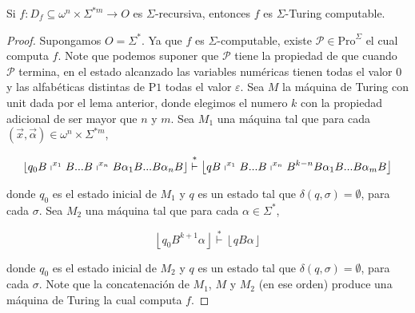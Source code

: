 	\begin{theorem}
		Si $f:D_{f}\subseteq \omega ^{n}\times \Sigma ^{\ast m}\rightarrow O$ es $ \Sigma $-recursiva, entonces $f$ es
    $\Sigma $-Turing computable.

  \begin{proof} Supongamos $O=\Sigma ^{\ast }.$ Ya que $f$ es $\Sigma $-computable, existe
    $ \mathcal{P}\in \mathrm{Pro}^{\Sigma }$ el cual computa $f$. Note que podemos suponer que $\mathcal{P}$ tiene la
    propiedad de que cuando $\mathcal{P}$ termina, en el estado alcanzado las variables numéricas tienen todas el valor
    $0$ y las alfabéticas distintas de $\mathrm{P}1$ todas el valor $ \varepsilon $. Sea $M$ la máquina de Turing con
    unit dada por el lema anterior, donde elegimos el numero $k$ con la propiedad adicional de ser mayor que $n$ y $m$.
    Sea $M_{1}$ una máquina tal que para cada $(\vec{x}, \vec{\alpha})\in \omega ^{n}\times \Sigma ^{\ast m}$,

  	\[
    \displaystyle \left\lfloor q_{0}B\shortmid ^{x_{1}}B...B\shortmid
    ^{x_{n}}B\alpha _{1}B...B\alpha _{n}B\right\rfloor \overset{\ast }{\vdash }\left\lfloor qB\shortmid
    ^{x_{1}}B...B\shortmid ^{x_{n}}B^{k-n}B\alpha _{1}B...B\alpha _{m}B\right\rfloor
  	\]

    donde $q_{0}$ es el estado inicial de $M_{1}$ y $q$ es un estado tal que $ \delta (q,\sigma )=\emptyset $, para cada
    $\sigma .$ Sea $M_{2}$ una máquina tal que para cada $\alpha \in \Sigma ^{\ast }$,

  	\[
    \displaystyle \left\lfloor q_{0}B^{k+1}\alpha \right\rfloor \overset{\ast }{\vdash } \left\lfloor qB\alpha \right\rfloor
  	\]

    donde $q_{0}$ es el estado inicial de $M_{2}$ y $q$ es un estado tal que $ \delta (q,\sigma )=\emptyset $, para cada
    $\sigma $. Note que la concatenación de $M_{1}$, $M$ y $M_{2}$ (en ese orden) produce una máquina de Turing la cual
    computa $f$.
	\end{proof}
	\end{theorem}
